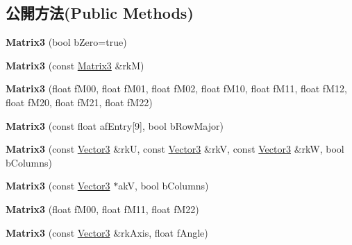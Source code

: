 \subsection*{公開方法(Public Methods)}
\begin{DoxyCompactItemize}
\item 
{\bfseries Matrix3} (bool b\+Zero=true)\hypertarget{class_magnum_1_1_matrix3_a82edbd25a617b2f4263127546d714192}{}\label{class_magnum_1_1_matrix3_a82edbd25a617b2f4263127546d714192}

\item 
{\bfseries Matrix3} (const \hyperlink{class_magnum_1_1_matrix3}{Matrix3} \&rkM)\hypertarget{class_magnum_1_1_matrix3_a7f48dbe3cc999ccbe2ff178bd1594e45}{}\label{class_magnum_1_1_matrix3_a7f48dbe3cc999ccbe2ff178bd1594e45}

\item 
{\bfseries Matrix3} (float f\+M00, float f\+M01, float f\+M02, float f\+M10, float f\+M11, float f\+M12, float f\+M20, float f\+M21, float f\+M22)\hypertarget{class_magnum_1_1_matrix3_a5bb862f7e2e0cd6e9bd8c8333d51c176}{}\label{class_magnum_1_1_matrix3_a5bb862f7e2e0cd6e9bd8c8333d51c176}

\item 
{\bfseries Matrix3} (const float af\+Entry\mbox{[}9\mbox{]}, bool b\+Row\+Major)\hypertarget{class_magnum_1_1_matrix3_adda28c5a66f34265b327e628183882bb}{}\label{class_magnum_1_1_matrix3_adda28c5a66f34265b327e628183882bb}

\item 
{\bfseries Matrix3} (const \hyperlink{class_magnum_1_1_vector3}{Vector3} \&rkU, const \hyperlink{class_magnum_1_1_vector3}{Vector3} \&rkV, const \hyperlink{class_magnum_1_1_vector3}{Vector3} \&rkW, bool b\+Columns)\hypertarget{class_magnum_1_1_matrix3_abc666cd3750a8b356212ebe39aab6044}{}\label{class_magnum_1_1_matrix3_abc666cd3750a8b356212ebe39aab6044}

\item 
{\bfseries Matrix3} (const \hyperlink{class_magnum_1_1_vector3}{Vector3} $\ast$akV, bool b\+Columns)\hypertarget{class_magnum_1_1_matrix3_a81da03ae95e0bff06b9937c6248ac71b}{}\label{class_magnum_1_1_matrix3_a81da03ae95e0bff06b9937c6248ac71b}

\item 
{\bfseries Matrix3} (float f\+M00, float f\+M11, float f\+M22)\hypertarget{class_magnum_1_1_matrix3_a1745b54a2306890d383102b6623fbfdc}{}\label{class_magnum_1_1_matrix3_a1745b54a2306890d383102b6623fbfdc}

\item 
{\bfseries Matrix3} (const \hyperlink{class_magnum_1_1_vector3}{Vector3} \&rk\+Axis, float f\+Angle)\hypertarget{class_magnum_1_1_matrix3_a6fa87cbf87c6f74ca563d660feabb69b}{}\label{class_magnum_1_1_matrix3_a6fa87cbf87c6f74ca563d660feabb69b}


\end{DoxyCompactItemize}
